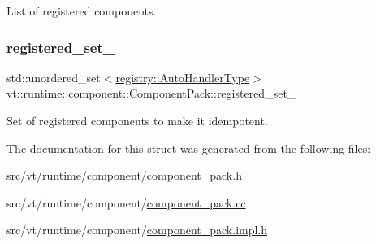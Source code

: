 List of registered components. 

\mbox{\label{structvt_1_1runtime_1_1component_1_1_component_pack_a7dd24ee6d0e1a8e66dd35257ba3e6d75}} 
\subsubsection{\texorpdfstring{registered\+\_\+set\+\_\+}{registered\_set\_}}
{\footnotesize\ttfamily std\+::unordered\+\_\+set$<$\hyperlink{namespacevt_1_1runtime_1_1component_1_1registry_a9b86518797c7bb91babf0ca8ee7d06e6}{registry\+::\+Auto\+Handler\+Type}$>$ vt\+::runtime\+::component\+::\+Component\+Pack\+::registered\+\_\+set\+\_\+\hspace{0.3cm}{\ttfamily [private]}}



Set of registered components to make it idempotent. 



The documentation for this struct was generated from the following files\+:\begin{DoxyCompactItemize}
\item 
src/vt/runtime/component/\hyperlink{component__pack_8h}{component\+\_\+pack.\+h}\item 
src/vt/runtime/component/\hyperlink{component__pack_8cc}{component\+\_\+pack.\+cc}\item 
src/vt/runtime/component/\hyperlink{component__pack_8impl_8h}{component\+\_\+pack.\+impl.\+h}\end{DoxyCompactItemize}
